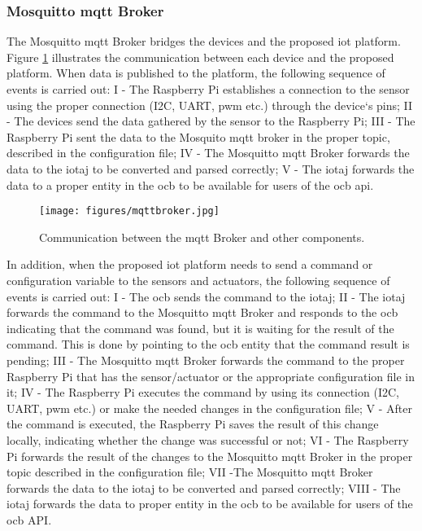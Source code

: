 \documentclass[preprint, review, 12pt]{elsarticle}
\begin{document}
\subsubsection{Mosquitto \gls{mqtt} Broker}
\label{sec:broker}

The Mosquitto \gls{mqtt} Broker bridges the devices and the proposed \gls{iot} platform. Figure \ref{fig:mqttBroker} illustrates the communication between each device and the proposed platform. When data is published to the platform, the following sequence of events is carried out: I - The Raspberry Pi establishes a connection to the sensor using the proper connection (I2C, UART, \gls{pwm} etc.) through the device`s pins; II - The devices send the data gathered by the sensor to the Raspberry Pi; III - The Raspberry Pi sent the data to the Mosquito \gls{mqtt} broker in the proper topic, described in the configuration file; IV - The Mosquitto \gls{mqtt} Broker forwards the data to the \gls{iotaj} to be converted and parsed correctly; V - The \gls{iotaj} forwards the data to a proper entity in the \gls{ocb} to be available for users of the \gls{ocb} \gls{api}. 

\begin{figure}[htbp]
    \centering
    \texttt{[image: figures/mqttbroker.jpg]}
    \caption{Communication between the \gls{mqtt} Broker and other components.}
    \label{fig:mqttBroker}
\end{figure}

In addition, when the proposed \gls{iot} platform needs to send a command or configuration variable to the sensors and actuators, the following sequence of events is carried out: I - The \gls{ocb} sends the command to the \gls{iotaj}; II - The \gls{iotaj} forwards the command to the Mosquitto \gls{mqtt} Broker and responds to the \gls{ocb} indicating that the command was found, but it is waiting for the result of the command. This is done by pointing to the \gls{ocb} entity that the command result is pending; III - The Mosquitto \gls{mqtt} Broker forwards the command to the proper Raspberry Pi that has the sensor/actuator or the appropriate configuration file in it; IV - The Raspberry Pi executes the command by using its connection (I2C, UART, \gls{pwm} etc.) or make the needed changes in the configuration file; V - After the command is executed, the Raspberry Pi saves the result of this change locally, indicating whether the change was successful or not;  VI - The Raspberry Pi forwards the result of the changes to the Mosquitto \gls{mqtt} Broker in the proper topic described in the configuration file; VII -The Mosquitto \gls{mqtt} Broker forwards the data to the \gls{iotaj} to be converted and parsed correctly; VIII - The \gls{iotaj} forwards the data to proper entity in the \gls{ocb} to be available for users of the \gls{ocb} API. 
\end{document}

